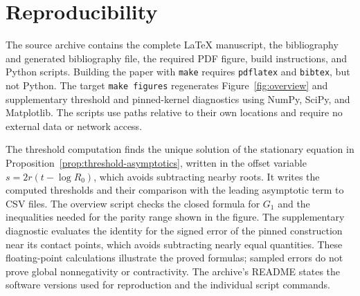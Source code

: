 \appendix
\section{Reproducibility}\label{app:reproduce}
The source archive contains the complete \LaTeX{} manuscript, the bibliography and generated bibliography file, the required PDF figure, build instructions, and Python scripts. Building the paper with \texttt{make} requires \texttt{pdflatex} and \texttt{bibtex}, but not Python. The target \texttt{make figures} regenerates Figure~\ref{fig:overview} and supplementary threshold and pinned-kernel diagnostics using NumPy, SciPy, and Matplotlib. The scripts use paths relative to their own locations and require no external data or network access.

The threshold computation finds the unique solution of the stationary equation in Proposition~\ref{prop:threshold-asymptotics}, written in the offset variable $s=2r(t-\log R_0)$, which avoids subtracting nearby roots. It writes the computed thresholds and their comparison with the leading asymptotic term to CSV files. The overview script checks the closed formula for $G_1$ and the inequalities needed for the parity range shown in the figure. The supplementary diagnostic evaluates the identity for the signed error of the pinned construction near its contact points, which avoids subtracting nearly equal quantities. These floating-point calculations illustrate the proved formulas; sampled errors do not prove global nonnegativity or contractivity. The archive's README states the software versions used for reproduction and the individual script commands.
